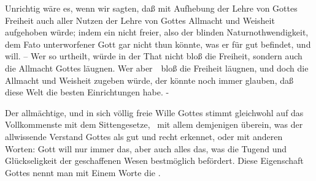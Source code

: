 \begin{RWanm} 
Unrichtig wäre es, wenn wir sagten, daß mit Aufhebung der Lehre von Gottes Freiheit auch aller Nutzen der Lehre von Gottes Allmacht und Weisheit aufgehoben würde; indem ein nicht freier, also der blinden Naturnothwendigkeit, dem Fato unterworfener Gott gar nicht thun könnte, was er für gut befindet, und will. -- Wer so urtheilt, würde in der That nicht bloß die Freiheit, sondern auch die Allmacht Gottes läugnen. Wer aber~\ bloß die Freiheit läugnen, und doch die Allmacht und Weisheit zugeben würde, der könnte noch immer glauben, daß diese Welt die besten Einrichtungen habe. -\end{RWanm}

Der allmächtige, und in sich völlig freie Wille Gottes stimmt gleichwohl auf das Vollkommenste mit dem Sittengesetze, \dh\ mit allem demjenigen überein, was der allwissende Verstand Gottes als gut und recht erkennet, oder mit anderen Worten: Gott will nur immer das, aber auch alles das, was die Tugend und Glückseligkeit der geschaffenen Wesen bestmöglich befördert. Diese Eigenschaft Gottes nennt man mit Einem Worte die .


